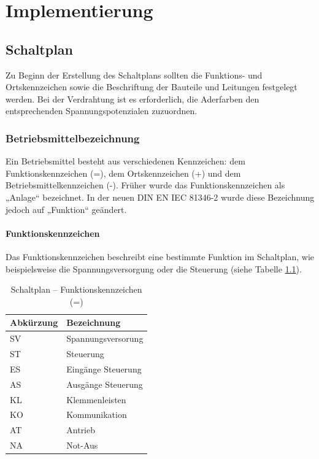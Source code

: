 \chapter{Implementierung}
\label{chapter:Implementierung}

\section{Schaltplan}
\label{section:Schaltplan}
Zu Beginn der Erstellung des Schaltplans sollten die Funktions- und Ortskennzeichen sowie die Beschriftung der Bauteile und Leitungen festgelegt werden. Bei der Verdrahtung ist es erforderlich, die Aderfarben den entsprechenden Spannungspotenzialen zuzuordnen.

\subsection{Betriebsmittelbezeichnung}
\label{Schaltplan:BMK}

Ein Betriebsmittel besteht aus verschiedenen Kennzeichen: dem Funktionskennzeichen (=), dem Ortskennzeichen (+) und dem Betriebsmittelkennzeichen (-). Früher wurde das Funktionskennzeichen als „Anlage“ bezeichnet. In der neuen DIN EN IEC 81346-2 \cite{DIN_EN_IEC_81346-2} wurde diese Bezeichnung jedoch auf „Funktion“ geändert.

\subsubsection{Funktionskennzeichen}
Das Funktionskennzeichen beschreibt eine bestimmte Funktion im Schaltplan, wie beispielsweise die Spannungsversorgung oder die Steuerung (siehe Tabelle \ref{BMK:tab:funktionskennzeichen}).

\pagebreak[1]
\begin{table}[!ht]
	\centering
	\caption{Schaltplan – Funktionskennzeichen (=)}
	\label{BMK:tab:funktionskennzeichen}
	\begin{tabular}{ll}
		\hline
		\textbf{Abkürzung}      & \textbf{Bezeichnung} \\ \hline
		\multicolumn{1}{l|}{SV} & Spannungsversorung   \\
		\multicolumn{1}{l|}{ST} & Steuerung            \\
		\multicolumn{1}{l|}{ES} & Eingänge Steuerung   \\
		\multicolumn{1}{l|}{AS} & Ausgänge Steuerung   \\
		\multicolumn{1}{l|}{KL} & Klemmenleisten       \\
		\multicolumn{1}{l|}{KO} & Kommunikation        \\
		\multicolumn{1}{l|}{AT} & Antrieb              \\
		\multicolumn{1}{l|}{NA} & Not-Aus              \\ \hline
	\end{tabular}
\end{table}
\pagebreak[1]

